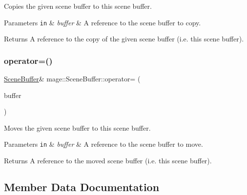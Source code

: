 Copies the given scene buffer to this scene buffer.


\begin{DoxyParams}[1]{Parameters}
\mbox{\tt in}  & {\em buffer} & A reference to the scene buffer to copy. \\
\hline
\end{DoxyParams}
\begin{DoxyReturn}{Returns}
A reference to the copy of the given scene buffer (i.\+e. this scene buffer). 
\end{DoxyReturn}
\hypertarget{structmage_1_1_scene_buffer_a2c7c87597f510bd4f964053988c89485}{}\label{structmage_1_1_scene_buffer_a2c7c87597f510bd4f964053988c89485} 
\subsubsection{\texorpdfstring{operator=()}{operator=()}\hspace{0.1cm}{\footnotesize\ttfamily [2/2]}}
{\footnotesize\ttfamily \hyperlink{structmage_1_1_scene_buffer}{Scene\+Buffer}\& mage\+::\+Scene\+Buffer\+::operator= (\begin{DoxyParamCaption}\item[{\hyperlink{structmage_1_1_scene_buffer}{Scene\+Buffer} \&\&}]{buffer }\end{DoxyParamCaption})\hspace{0.3cm}{\ttfamily [default]}}

Moves the given scene buffer to this scene buffer.


\begin{DoxyParams}[1]{Parameters}
\mbox{\tt in}  & {\em buffer} & A reference to the scene buffer to move. \\
\hline
\end{DoxyParams}
\begin{DoxyReturn}{Returns}
A reference to the moved scene buffer (i.\+e. this scene buffer). 
\end{DoxyReturn}


\subsection{Member Data Documentation}
\hypertarget{structmage_1_1_scene_buffer_a1c077575d9bdb7b6300874a12ac7f16e}{}\label{structmage_1_1_scene_buffer_a1c077575d9bdb7b6300874a12ac7f16e} 

